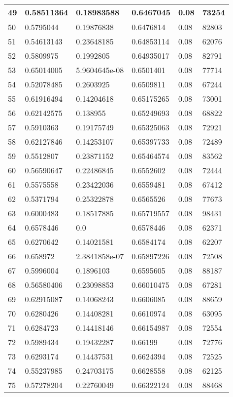\begin{longtable}{|l|l|l|l|l|l|}
49 & 0.58511364 & 0.18983588 & 0.6467045 & 0.08 & 73254 \\ \hline 
50 & 0.5795044 & 0.19876838 & 0.6476814 & 0.08 & 82803 \\ \hline 
51 & 0.54613143 & 0.23648185 & 0.64853114 & 0.08 & 62076 \\ \hline 
52 & 0.5809975 & 0.1992805 & 0.64935017 & 0.08 & 82791 \\ \hline 
53 & 0.65014005 & 5.9604645e-08 & 0.6501401 & 0.08 & 77714 \\ \hline 
54 & 0.52078485 & 0.2603925 & 0.6509811 & 0.08 & 67244 \\ \hline 
55 & 0.61916494 & 0.14204618 & 0.65175265 & 0.08 & 73001 \\ \hline 
56 & 0.62142575 & 0.138955 & 0.65249693 & 0.08 & 68822 \\ \hline 
57 & 0.5910363 & 0.19175749 & 0.65325063 & 0.08 & 72921 \\ \hline 
58 & 0.62127846 & 0.14253107 & 0.65397733 & 0.08 & 72489 \\ \hline 
59 & 0.5512807 & 0.23871152 & 0.65464574 & 0.08 & 83562 \\ \hline 
60 & 0.56590647 & 0.22486845 & 0.6552602 & 0.08 & 72444 \\ \hline 
61 & 0.5575558 & 0.23422036 & 0.6559481 & 0.08 & 67412 \\ \hline 
62 & 0.5371794 & 0.25322878 & 0.6565526 & 0.08 & 77673 \\ \hline 
63 & 0.6000483 & 0.18517885 & 0.65719557 & 0.08 & 98431 \\ \hline 
64 & 0.6578446 & 0.0 & 0.6578446 & 0.08 & 62371 \\ \hline 
65 & 0.6270642 & 0.14021581 & 0.6584174 & 0.08 & 62207 \\ \hline 
66 & 0.658972 & 2.3841858e-07 & 0.65897226 & 0.08 & 72508 \\ \hline 
67 & 0.5996004 & 0.1896103 & 0.6595605 & 0.08 & 88187 \\ \hline 
68 & 0.56580406 & 0.23098853 & 0.66010475 & 0.08 & 67281 \\ \hline 
69 & 0.62915087 & 0.14068243 & 0.6606085 & 0.08 & 88659 \\ \hline 
70 & 0.6280426 & 0.14408281 & 0.6610974 & 0.08 & 63095 \\ \hline 
71 & 0.6284723 & 0.14418146 & 0.66154987 & 0.08 & 72554 \\ \hline 
72 & 0.5989434 & 0.19432287 & 0.66199 & 0.08 & 72776 \\ \hline 
73 & 0.6293174 & 0.14437531 & 0.6624394 & 0.08 & 72525 \\ \hline 
74 & 0.55237985 & 0.24703175 & 0.6628558 & 0.08 & 62125 \\ \hline 
75 & 0.57278204 & 0.22760049 & 0.66322124 & 0.08 & 88468 \\ \hline 
\end{longtable}